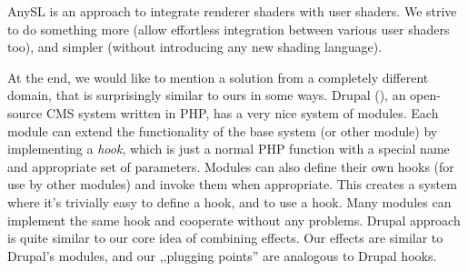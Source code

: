 \documentclass{egpubl}
\begin{document}
AnySL \cite{anysl} is an approach to integrate renderer
shaders with user shaders. We strive to do something more (allow effortless
integration between various user shaders too), and simpler (without
introducing any new shading language).


At the end, we would like to mention a solution from a completely
different domain, that is surprisingly similar to ours in some ways.
Drupal (),
an open-source CMS system written in PHP,
has a very nice system of modules. Each module
can extend the functionality of the base system (or other module)
by implementing a \textit{hook}, which is just a normal PHP function
with a special name and appropriate set of parameters. Modules can also define
their own hooks (for use by other modules) and invoke them when appropriate.
This creates a system where it's trivially easy to define a hook,
and to use a hook.
Many modules can implement the same hook and cooperate without any problems.
Drupal approach is quite similar to our
core idea of combining effects. Our effects are similar to
Drupal's modules, and our ,,plugging points'' are analogous to Drupal hooks.


%
%
\end{document}
